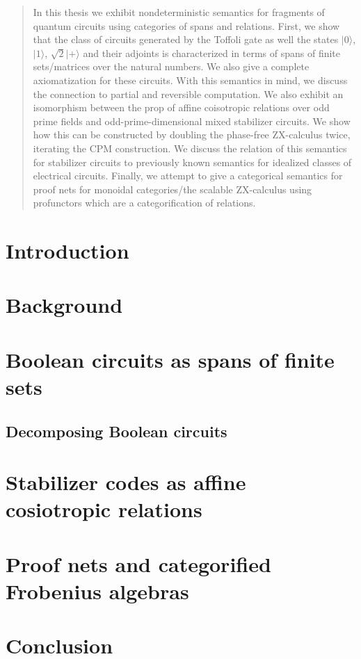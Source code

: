 \documentclass[12pt]{ociamthesis}  %
\begin{document}
\begin{abstract}
In this thesis we exhibit nondeterministic semantics for fragments of quantum circuits using  categories of spans and relations.  First, we show that the class of circuits generated by the  Toffoli gate as well the states $|0\rangle$, $|1\rangle$, $\sqrt{2}|+\rangle$ and their adjoints is characterized in terms of spans of finite sets/matrices over the natural numbers.  We also give a complete axiomatization for these circuits.  With this semantics in mind, we discuss the connection to partial and reversible computation. We also exhibit an isomorphism between the prop of affine coisotropic relations over odd prime fields and odd-prime-dimensional mixed stabilizer circuits.  We show how this can be constructed by doubling the phase-free ZX-calculus twice, iterating the CPM construction.  We discuss the relation of this semantics for stabilizer circuits to  previously known semantics for idealized classes of electrical circuits.     Finally, we attempt to give a categorical semantics for proof nets for monoidal categories/the scalable ZX-calculus using profunctors which are a categorification of relations.
\end{abstract}


\tableofcontents

\chapter{Introduction}
\label{chap:intro}


\chapter{Background}
\label{chap:background}






\chapter{Boolean circuits as spans of finite sets}
\label{chap:zxa}


\section{Decomposing Boolean circuits}
\label{sec:dist}


\chapter{Stabilizer codes as affine cosiotropic relations}
\label{chap:stab}


\chapter{Proof nets and categorified Frobenius algebras}
\label{chap:grothendieck}


\chapter{Conclusion}
\label{chap:conclusion}




\end{document}
